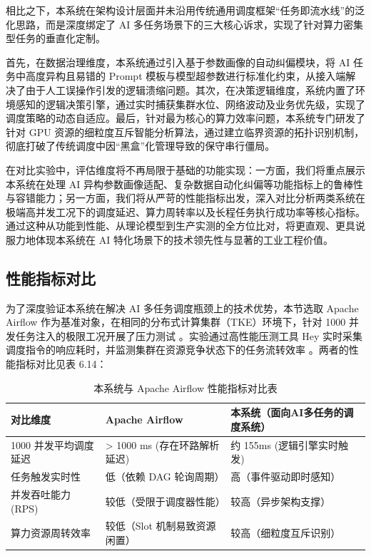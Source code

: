 相比之下，本系统在架构设计层面并未沿用传统通用调度框架“任务即流水线”的泛化思路，而是深度绑定了 AI 多任务场景下的三大核心诉求，实现了针对算力密集型任务的垂直化定制。

首先，在数据治理维度，本系统通过引入基于参数画像的自动纠偏模块，将 AI 任务中高度异构且易错的 Prompt 模板与模型超参数进行标准化约束，从接入端解决了由于人工误操作引发的逻辑溃缩问题。其次，在决策逻辑维度，系统内置了环境感知的逻辑决策引擎，通过实时捕获集群水位、网络波动及业务优先级，实现了调度策略的动态自适应。最后，针对最为核心的算力效率问题，本系统专门研发了针对 GPU 资源的细粒度互斥智能分析算法，通过建立临界资源的拓扑识别机制，彻底打破了传统调度中因“黑盒”化管理导致的保守串行僵局。


在对比实验中，评估维度将不再局限于基础的功能实现：一方面，我们将重点展示本系统在处理 AI 异构参数画像适配、复杂数据自动化纠偏等功能指标上的鲁棒性与容错能力；另一方面，我们将从严苛的性能指标出发，深入对比分析两类系统在极端高并发工况下的调度延迟、算力周转率以及长程任务执行成功率等核心指标。通过这种从功能到性能、从理论模型到生产实测的全方位比对，将更直观、更具说服力地体现本系统在 AI 特化场景下的技术领先性与显著的工业工程价值。

\subsection{性能指标对比}

为了深度验证本系统在解决 AI 多任务调度瓶颈上的技术优势，本节选取 Apache Airflow 作为基准对象，在相同的分布式计算集群（TKE）环境下，针对 1000 并发任务注入的极限工况开展了压力测试 。实验通过高性能压测工具 Hey 实时采集调度指令的响应耗时，并监测集群在资源竞争状态下的任务流转效率 。两者的性能指标对比见表 6.14：

\begin{table}[htbp]
\centering
\caption{本系统与 Apache Airflow 性能指标对比表}
\begin{tabularx}{\textwidth}{lXX}
\toprule
\textbf{对比维度} & \textbf{Apache Airflow} & \textbf{本系统（面向AI多任务的调度系统）} \\ 
\midrule
1000 并发平均调度延迟 & > 1000 ms (存在环路解析延迟) & 约 155ms (逻辑引擎实时触发) \\ 
任务触发实时性 & 低（依赖 DAG 轮询周期） & 高（事件驱动即时感知） \\ 
并发吞吐能力 (RPS) & 较低（受限于调度器性能） & 较高（异步架构支撑） \\ 
算力资源周转效率 & 较低（Slot 机制易致资源闲置） & 较高（细粒度互斥识别） \\ 
\bottomrule
\end{tabularx}
\label{tab:airflow_comparison}
\end{table}

